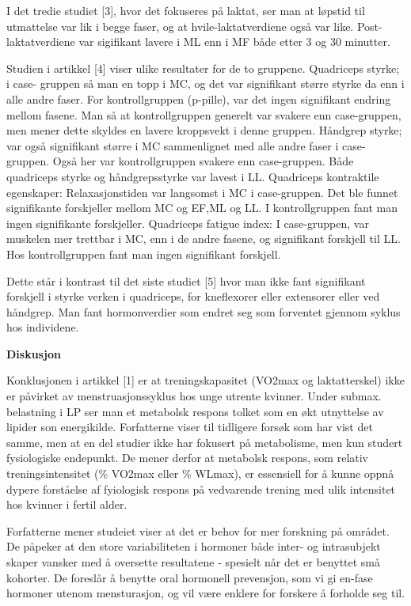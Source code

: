 \documentclass[
  letterpaper,
  DIV=11,
  numbers=noendperiod]{scrreprt}
\begin{document}
I det tredie studiet {[}3{]}, hvor det fokuseres på laktat, ser man at
løpstid til utmattelse var lik i begge faser, og at hvile-laktatverdiene
også var like. Post-laktatverdiene var sigifikant lavere i ML enn i MF
både etter 3 og 30 minutter.

Studien i artikkel {[}4{]} viser ulike resultater for de to gruppene.
Quadriceps styrke; i case- gruppen så man en topp i MC, og det var
signifikant større styrke da enn i alle andre faser. For kontrollgruppen
(p-pille), var det ingen signifikant endring mellom fasene. Man så at
kontrollgruppen generelt var svakere enn case-gruppen, men mener dette
skyldes en lavere kroppsvekt i denne gruppen. Håndgrep styrke; var også
signifikant større i MC sammenlignet med alle andre faser i
case-gruppen. Også her var kontrollgruppen svakere enn case-gruppen.
Både quadriceps styrke og håndgrepsstyrke var lavest i LL. Quadriceps
kontraktile egenskaper: Relaxasjonstiden var langsomst i MC i
case-gruppen. Det ble funnet signifikante forskjeller mellom MC og EF,ML
og LL. I kontrollgruppen fant man ingen signifikante forskjeller.
Quadriceps fatigue index: I case-gruppen, var muskelen mer trettbar i
MC, enn i de andre fasene, og signifikant forskjell til LL. Hos
kontrollgruppen fant man ingen signifikant forskjell.

Dette står i kontrast til det siste studiet {[}5{]} hvor man ikke fant
signifikant forskjell i styrke verken i quadriceps, for kneflexorer
eller extensorer eller ved håndgrep. Man fant hormonverdier som endret
seg som forventet gjennom syklus hos individene.

\textbf{Diskusjon}

Konklusjonen i artikkel {[}1{]} er at treningskapasitet (VO2max og
laktatterskel) ikke er påvirket av menstruasjonssyklus hos unge utrente
kvinner. Under submax. belastning i LP ser man et metabolsk respons
tolket som en økt utnyttelse av lipider son energikilde. Forfatterne
viser til tidligere forsøk som har vist det samme, men at en del studier
ikke har fokusert på metabolisme, men kun studert fysiologiske
endepunkt. De mener derfor at metabolsk respons, som relativ
treningsintensitet (\% VO2max eller \% WLmax), er essensiell for å kunne
oppnå dypere forståelse af fyiologisk respons på vedvarende trening med
ulik intensitet hos kvinner i fertil alder.

Forfatterne mener studeiet viser at det er behov for mer forskning på
området. De påpeker at den store variabiliteten i hormoner både inter-
og intrasubjekt skaper vansker med å oversette resultatene - spesielt
når det er benyttet små kohorter. De foreslår å benytte oral hormonell
prevensjon, som vi gi en-fase hormoner utenom mensturasjon, og vil være
enklere for forskere å forholde seg til.
\end{document}
